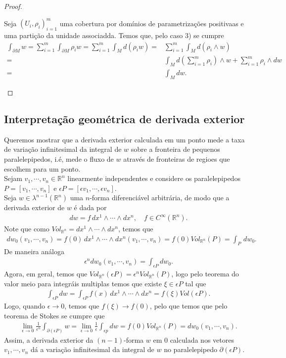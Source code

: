 \begin{proof}
\begin{itemize}
      Seja $(U_i,\rho_i)_{i=1}^{m}$ uma cobertura por domínios de parametrizações positivaas e uma partição da unidade associadda. Temos que, pelo caso 3) se cumpre
      \begin{align*}
        \int_{\partial M}w=\sum_{i=1}^{m}\int_{\partial M}\rho_i w=\sum_{i=1}^{m}\int_{M}d(\rho_i w)=&\sum_{i=1}^{m}\int_M d(\rho_i\wedge w)\\
        =&\int_{M}d\left( \sum_{i=1}^{m}\rho_i \right)\wedge w + \sum_{i=1}^{m}\rho_i\wedge dw\\
        =&\int_{M}dw.
      \end{align*}
  \end{itemize}
\end{proof}
\subsection{Interpretação geométrica de derivada exterior}
  Queremos mostrar que a derivada exterior calculada em um ponto mede a taxa de variação infinitesimal da integral de $w$ sobre a fronteira de pequenos paralelepipedos, i.é, mede o fluxo de $w$ através de fronteiras de regioes que escolhem para um ponto.\\
  Sejam $v_1,\cdots,v_n\in\mathbb{R}^{n}$ linearmente independentes e considere os paralelepipedos $P=[v_1,\cdots,v_n]$ e $\epsilon P=[\epsilon v_1,\cdots, \epsilon v_n]$.\\
  Seja $w\in\lambda^{n-1}(\mathbb{R}^{n})$ uma $n$-forma diferenciável arbitrária, de modo que a derivada exterior de $w$ é dada por
  \begin{align*}
    dw=f\,dx^{1}\wedge\cdots\wedge dx^{n},\quad f\in C^{\infty}(\mathbb{R}^{n}).
  \end{align*}
  Note que como $Vol_{\mathbb{R}^{n}}=dx^{1}\wedge\cdots\wedge dx^{n}$, temos que
  \begin{align*}
    dw_0(v_1,\cdots,v_n)=f(0)\,dx^{1}\wedge\cdots\wedge dx^{n}(v_1,\cdots,v_n)=f(0)Vol_{\mathbb{R}^{n}}(P)=\int_{P}\,dw_0.
  \end{align*}
  De maneira análoga
  \begin{align*}
    \epsilon^{n}dw_0(v_1,\cdots,v_n)=\int_{\epsilon P}dw_0.
  \end{align*}
  Agora, em geral, temos que $Vol_{\mathbb{R}^{n}}(\epsilon P)=\epsilon^{n}Vol_{\mathbb{R}^{n}}(P)$, logo pelo teorema do valor meio para integráis multiplas temos que existe $\xi\in\epsilon P$ tal que
  \begin{align*}
    \int_{\epsilon P}dw=\int_{\epsilon P}f(x)\, dx^{1}\wedge\cdots\wedge dx^{n}=f(\xi)Vol(\epsilon P).
  \end{align*}
  Logo, quando $\epsilon\to 0$, temos que $f(\xi)\to f(0)$, pelo que temos que pelo teorema de Stokes se cumpre que
  \begin{align*}
    \lim_{\epsilon \to 0}\frac{1}{\epsilon^{n}}\int_{\partial(\epsilon P)}w=\lim_{\epsilon \to 0}\frac{1}{\epsilon}\int_{\epsilon p}dw=f(0)Vol_{\mathbb{R}^{n}}(P)=dw_0(v_1,\cdots,v_n).
  \end{align*}
  Assim, a derivada exterior da $(n-1)$-forma $w$ em $0$ calculada nos vetores $v_1,\cdots,v_n$ dá a variação infinitesimal da integral de $w$ no paralelepipedo $\partial(\epsilon P)$.
